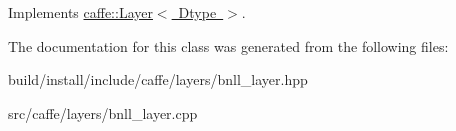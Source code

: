 Implements \mbox{\hyperlink{classcaffe_1_1_layer_a576ac6a60b1e99fe383831f52a6cea77}{caffe\+::\+Layer$<$ Dtype $>$}}.



The documentation for this class was generated from the following files\+:\begin{DoxyCompactItemize}
\item 
build/install/include/caffe/layers/bnll\+\_\+layer.\+hpp\item 
src/caffe/layers/bnll\+\_\+layer.\+cpp\end{DoxyCompactItemize}
